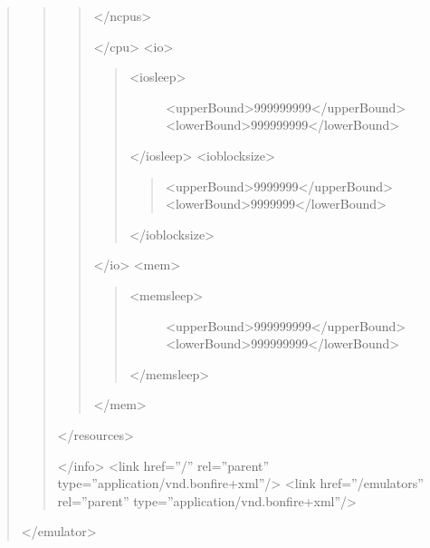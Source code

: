 \documentclass[letterpaper,10pt,english]{sphinxhowto}
\begin{document}
\begin{quote}
\begin{quote}
\begin{description}
\begin{quote}
\begin{description}
\begin{description}
\end{description}

\textless{}/ncpus\textgreater{}

\end{description}

\textless{}/cpu\textgreater{}
\textless{}io\textgreater{}
\begin{quote}
\begin{description}
\item[{\textless{}iosleep\textgreater{}}] \leavevmode
\textless{}upperBound\textgreater{}999999999\textless{}/upperBound\textgreater{}
\textless{}lowerBound\textgreater{}999999999\textless{}/lowerBound\textgreater{}

\end{description}

\textless{}/iosleep\textgreater{}
\textless{}ioblocksize\textgreater{}
\begin{quote}

\textless{}upperBound\textgreater{}9999999\textless{}/upperBound\textgreater{}
\textless{}lowerBound\textgreater{}9999999\textless{}/lowerBound\textgreater{}
\end{quote}

\textless{}/ioblocksize\textgreater{}
\end{quote}

\textless{}/io\textgreater{}
\textless{}mem\textgreater{}
\begin{quote}
\begin{description}
\item[{\textless{}memsleep\textgreater{}}] \leavevmode
\textless{}upperBound\textgreater{}999999999\textless{}/upperBound\textgreater{}
\textless{}lowerBound\textgreater{}999999999\textless{}/lowerBound\textgreater{}

\end{description}

\textless{}/memsleep\textgreater{}
\end{quote}

\textless{}/mem\textgreater{}
\end{quote}

\textless{}/resources\textgreater{}

\end{description}

\textless{}/info\textgreater{}
\textless{}link href=''/'' rel=''parent'' type=''application/vnd.bonfire+xml''/\textgreater{}
\textless{}link href=''/emulators'' rel=''parent'' type=''application/vnd.bonfire+xml''/\textgreater{}
\end{quote}

\textless{}/emulator\textgreater{}
\end{quote}
\end{document}
